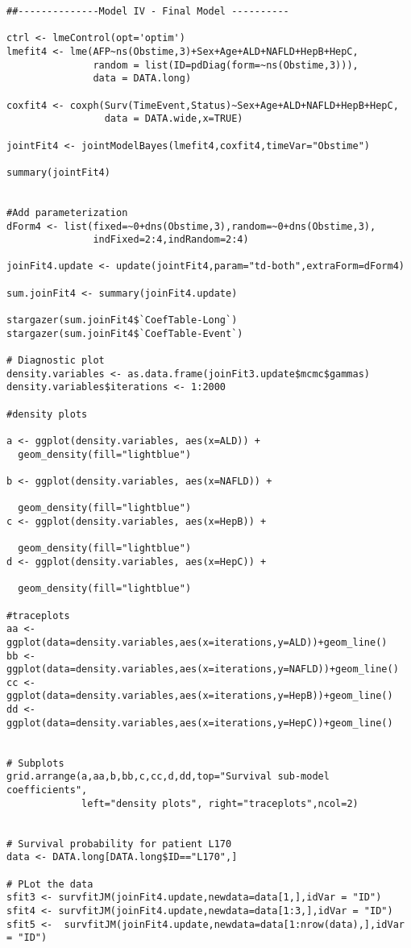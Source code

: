 \documentclass[11pt,twoside]{article}
\numberwithin{Theorem}{section}
\numberwithin{Definition}{section}
\numberwithin{Lemma}{section}
\numberwithin{Algorithm}{section}
\numberwithin{equation}{section}
\begin{document}
\begin{lstlisting}
##--------------Model IV - Final Model ----------

ctrl <- lmeControl(opt='optim')
lmefit4 <- lme(AFP~ns(Obstime,3)+Sex+Age+ALD+NAFLD+HepB+HepC,
               random = list(ID=pdDiag(form=~ns(Obstime,3))),
               data = DATA.long)

coxfit4 <- coxph(Surv(TimeEvent,Status)~Sex+Age+ALD+NAFLD+HepB+HepC,
                 data = DATA.wide,x=TRUE)

jointFit4 <- jointModelBayes(lmefit4,coxfit4,timeVar="Obstime")

summary(jointFit4)


#Add parameterization
dForm4 <- list(fixed=~0+dns(Obstime,3),random=~0+dns(Obstime,3),
               indFixed=2:4,indRandom=2:4)

joinFit4.update <- update(jointFit4,param="td-both",extraForm=dForm4)

sum.joinFit4 <- summary(joinFit4.update)

stargazer(sum.joinFit4$`CoefTable-Long`)
stargazer(sum.joinFit4$`CoefTable-Event`)

# Diagnostic plot
density.variables <- as.data.frame(joinFit3.update$mcmc$gammas)
density.variables$iterations <- 1:2000

#density plots

a <- ggplot(density.variables, aes(x=ALD)) +
  geom_density(fill="lightblue")

b <- ggplot(density.variables, aes(x=NAFLD)) +

  geom_density(fill="lightblue")
c <- ggplot(density.variables, aes(x=HepB)) +

  geom_density(fill="lightblue")
d <- ggplot(density.variables, aes(x=HepC)) +

  geom_density(fill="lightblue")

#traceplots
aa <- ggplot(data=density.variables,aes(x=iterations,y=ALD))+geom_line()
bb <- ggplot(data=density.variables,aes(x=iterations,y=NAFLD))+geom_line()
cc <- ggplot(data=density.variables,aes(x=iterations,y=HepB))+geom_line()
dd <- ggplot(data=density.variables,aes(x=iterations,y=HepC))+geom_line()


# Subplots
grid.arrange(a,aa,b,bb,c,cc,d,dd,top="Survival sub-model coefficients",
             left="density plots", right="traceplots",ncol=2)


# Survival probability for patient L170
data <- DATA.long[DATA.long$ID=="L170",]

# PLot the data
sfit3 <- survfitJM(joinFit4.update,newdata=data[1,],idVar = "ID")
sfit4 <- survfitJM(joinFit4.update,newdata=data[1:3,],idVar = "ID")
sfit5 <-  survfitJM(joinFit4.update,newdata=data[1:nrow(data),],idVar = "ID")


\end{lstlisting}
\end{document}
